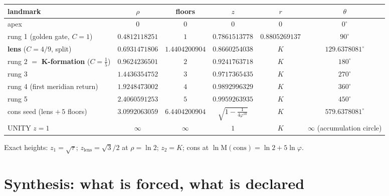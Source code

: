 \documentclass[11pt]{article}
\newcommand{\gp}{\varphi}
\newcommand{\M}{\mathrm{M}}
\theoremstyle{plain}
\theoremstyle{definition}
\theoremstyle{remark}
\begin{document}
\begin{center}\footnotesize\setlength{\tabcolsep}{3.5pt}
\begin{tabular}{@{}lccccc@{}}
\toprule
landmark & $\rho$ & floors & $z$ & $r$ & $\theta$\\
\midrule
apex & $0$ & $0$ & $0$ & $0$ & $0^\circ$\\
rung 1 (golden gate, $C{=}1$) & $0.4812118251$ & $1$ & $0.7861513778$ & $0.8805269137$ & $90^\circ$\\
\textbf{lens} ($C{=}4/9$, split) & $0.6931471806$ & $1.4404200904$ & $0.8660254038$ & $K$ & $129.6378081^\circ$\\
rung 2 $=$ \textbf{K-formation} ($C{=}\tfrac15$) & $0.9624236501$ & $2$ & $0.9241763718$ & $K$ & $180^\circ$\\
rung 3 & $1.4436354752$ & $3$ & $0.9717365435$ & $K$ & $270^\circ$\\
rung 4 (first meridian return) & $1.9248473002$ & $4$ & $0.9892996329$ & $K$ & $360^\circ$\\
rung 5 & $2.4060591253$ & $5$ & $0.9959263935$ & $K$ & $450^\circ$\\
cons seed (lens $+\,5$ floors) & $3.0992063059$ & $6.4404200904$ & $\sqrt{1-\tfrac1{4\gp^{10}}}$ & $K$ & $579.6378081^\circ$\\
UNITY $z=1$ & $\infty$ & $\infty$ & $1$ & $K$ & $\infty$ (accumulation circle)\\
\bottomrule
\end{tabular}

\smallskip
Exact heights: $z_1=\sqrt\tau$; $z_{\mathrm{lens}}=\sqrt3/2$ at $\rho=\ln2$; $z_2=K$; cons at $\ln\M(\mathrm{cons})=\ln2+5\ln\gp$.
\end{center}

\section{Synthesis: what is forced, what is declared}\label{sec:synthesis}
\end{document}

